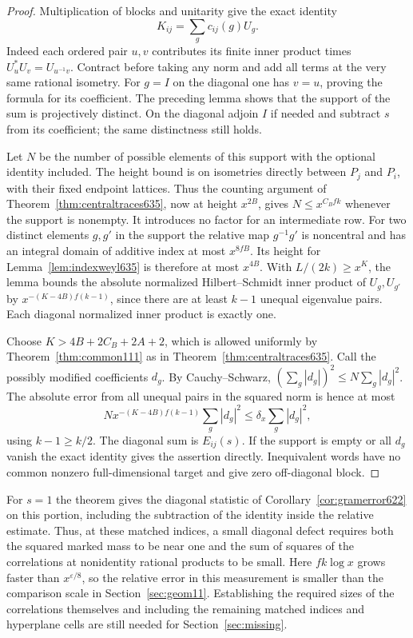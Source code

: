 \documentclass[a4paper,11pt]{article}
\theoremstyle{definition}
\theoremstyle{remark}
\numberwithin{equation}{section}
\begin{document}
\begin{proof}
Multiplication of blocks and unitarity give the exact identity
\[
              K_{ij}=\sum_g c_{ij}(g) U_g .
\]
Indeed each ordered pair \(u,v\) contributes its finite inner
product times \(U_u^*U_v=U_{u^{-1}v}\). Contract before taking
any norm and add all terms at the very same rational isometry.
For \(g=I\) on the diagonal one has \(v=u\), proving the formula
for its coefficient. The preceding lemma shows that the support
of the sum is projectively distinct. On the diagonal adjoin \(I\)
if needed and subtract \(s\) from its coefficient; the same
distinctness still holds.

Let \(N\) be the number of possible elements of this support with
the optional identity included. The height bound is on isometries
directly between \(P_j\) and \(P_i\), with their fixed endpoint
lattices. Thus the counting argument of
Theorem~\ref{thm:centraltraces635}, now at height \(x^{2B}\),
gives \(N\le x^{C_B f k}\) whenever the support is nonempty.
It introduces no factor for an intermediate row. For two distinct
elements \(g,g'\) in the support the relative map \(g^{-1}g'\)
is noncentral and has an integral domain of additive index at most
\(x^{8fB}\). Its height for Lemma~\ref{lem:indexweyl635} is
therefore at most \(x^{4B}\). With \(L/(2k)\ge x^K\), the lemma
bounds the absolute normalized Hilbert--Schmidt inner product of
\(U_g,U_{g'}\) by \(x^{-(K-4B) f(k-1)}\), since there are at
least \(k-1\) unequal eigenvalue pairs. Each diagonal normalized
inner product is exactly one.

Choose \(K>4B+2C_B+2A+2\), which is allowed uniformly by
Theorem~\ref{thm:common111} as in Theorem~\ref{thm:centraltraces635}.
Call the possibly modified coefficients \(d_g\). By Cauchy--Schwarz,
\((\sum_g|d_g|)^2\le N\sum_g|d_g|^2\). The absolute error from
all unequal pairs in the squared norm is hence at most
\[
            N x^{-(K-4B)f(k-1)}\sum_g|d_g|^2
                      \le\delta_x\sum_g|d_g|^2 ,
\]
using \(k-1\ge k/2\). The diagonal sum is \(E_{ij}(s)\). If
the support is empty or all \(d_g\) vanish the exact identity
gives the assertion directly. Inequivalent words have no common
nonzero full-dimensional target and give zero off-diagonal block.
\end{proof}

For \(s=1\) the theorem gives the diagonal statistic of
Corollary~\ref{cor:gramerror622} on this portion, including the
subtraction of the identity inside the relative estimate. Thus,
at these matched indices, a small diagonal defect requires both
the squared marked mass to be near one and the sum of squares of
the correlations at nonidentity rational products to be small.
Here \(fk\log x\) grows faster than \(x^{\varepsilon/8}\), so the
relative error in this measurement is smaller than the comparison
scale in Section~\ref{sec:geom11}. Establishing the required
sizes of the correlations themselves and including the remaining
matched indices and hyperplane cells are still needed for
Section~\ref{sec:missing}.
\end{document}

